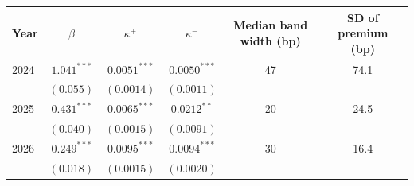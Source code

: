 \begin{tabular}{lccccc}
\toprule
 Year & $\beta$ & $\kappa^+$ & $\kappa^-$ & Median band width (bp) & SD of premium (bp) \\
\midrule
2024 & $1.041^{***}$ & $0.0051^{***}$ & $0.0050^{***}$ & 47 & 74.1 \\
 & $(0.055)$ & $(0.0014)$ & $(0.0011)$ & & \\
2025 & $0.431^{***}$ & $0.0065^{***}$ & $0.0212^{**}$ & 20 & 24.5 \\
 & $(0.040)$ & $(0.0015)$ & $(0.0091)$ & & \\
2026 & $0.249^{***}$ & $0.0095^{***}$ & $0.0094^{***}$ & 30 & 16.4 \\
 & $(0.018)$ & $(0.0015)$ & $(0.0020)$ & & \\
\bottomrule
\end{tabular}
